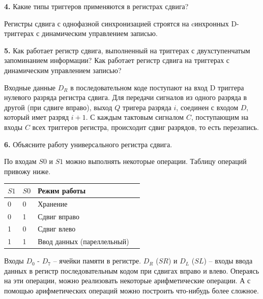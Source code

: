 \documentclass[a4paper,12pt]{article}
\begin{document}
\noindent\textbf{4.} Какие типы триггеров применяются в регистрах сдвига?\newline

\noindent Регистры сдвига с однофазной синхронизацией строятся на cинхронных D-триггерах с динамическим управлением записью.
\newline

\noindent\textbf{5.} Как работает регистр сдвига, выполненный на триггерах с двухступенчатым запоминанием информации? Как работает регистр сдвига на триггерах с динамическим управлением записью?\newline

\noindent Входные данные $D_{R}$ в последовательном коде поступают на вход D триггера нулевого разряда регистра сдвига. Для передачи сигналов из одного разряда в другой (при сдвиге вправо), выход $Q$ тригера разряда $i$, соединен с входом $D$, который имет разряд $i + 1$. С каждым тактовым сигналом $C$, поступающим на входы $C$ всех триггеров регистра, происходит сдвиг разрядов, то есть перезапись.
\newline

\noindent\textbf{6.} Объясните работу универсального регистра сдвига.\newline

\noindent По входам $S0$ и $S1$ можно выполнять некоторые операции. Таблицу операций привожу ниже.

\begin{center}
	\begin{tabular}{ | l | l | l | p{1cm} |}
		\hline
		$S1$ & $S0$ & Режим работы  \\ \hline
		
		0 & 0 & Хранение  \\ \hline
		0 & 1 & Сдвиг вправо  \\ \hline
		1 & 0 & Сдвиг влево  \\ \hline
		1 & 1 & Ввод данных (пареллельный)  \\ 
		\hline
	\end{tabular}
\end{center}


\noindent Входы $D_{0}$ - $D_{7}$ -- ячейки памяти в регистре. $D_{R}$ ($SR$) и $D_{L}$ ($SL$) -- входы ввода данных в регистр последовательным кодом при сдвигах вправо и влево. Операясь на эти операции, можно реализовать некоторые арифметические операции. А с помощью арифметических операций можно построить что-нибудь более сложное.
\end{document}
